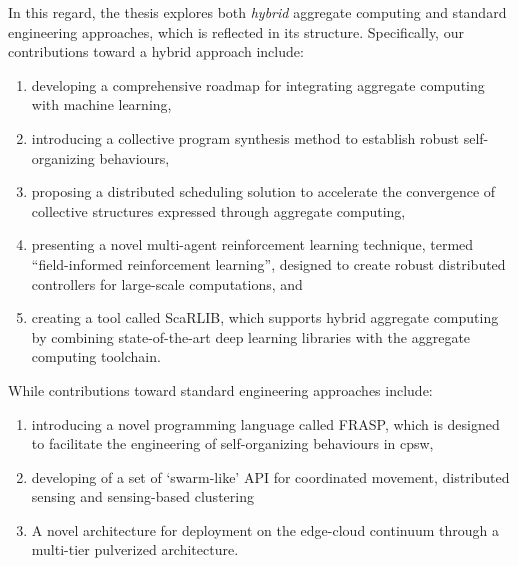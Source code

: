 \begin{refsection}
In this regard, the thesis explores both \emph{hybrid} aggregate computing and standard engineering approaches, which is reflected in its structure. Specifically, our contributions toward a hybrid approach include:
\begin{enumerate}
    \item developing a comprehensive roadmap for integrating aggregate computing with machine learning,
    \item introducing a collective program synthesis method to establish robust self-organizing behaviours,
    \item proposing a distributed scheduling solution to accelerate the convergence of collective structures expressed through aggregate computing,
    \item presenting a novel multi-agent reinforcement learning technique, termed ``field-informed reinforcement learning'', designed to create robust distributed controllers for large-scale computations, and
    \item creating a tool called ScaRLIB, which supports hybrid aggregate computing by combining state-of-the-art deep learning libraries with the aggregate computing toolchain.
\end{enumerate}
While  contributions toward standard engineering approaches include:
\begin{enumerate}
    \item introducing a novel programming language called FRASP, 
    which is designed to facilitate the engineering of self-organizing behaviours in \ac{cpsw},
    \item developing of a set of `swarm-like' API for coordinated movement, distributed sensing and sensing-based clustering
    \item A novel architecture for deployment on the edge-cloud continuum through a multi-tier pulverized architecture.
\end{enumerate}
\begin{figure}

\end{figure}
\end{refsection}
